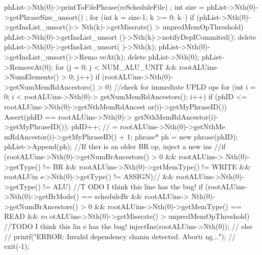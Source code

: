 \begin{DoxyCode}
{{{{{{                                phList->Nth(0)->printToFilePhrase(reScheduleFile)
      ;
                                int size = phList->Nth(0)->getPhraseSize_unsort()
      ;
                                for (int k = size-1; k >= 0; k--) {
                                        if (phList->Nth(0)->getInsList_unsort()->
      Nth(k)->getMissrate() > unpredMemOpThreshold) 
                                                phList->Nth(0)->getInsList_unsort
      ()->Nth(k)->notifyDepICommited();
                                        delete phList->Nth(0)->getInsList_unsort(
      )->Nth(k);
                                        phList->Nth(0)->getInsList_unsort()->Remo
      veAt(k);
                                }
                                delete phList->Nth(0);
                                phList->RemoveAt(0);
                        }
                }
        }
        for (j = 0; j < NUM_ALU_UNIT && rootALUins->NumElements() > 0; j++) {
                if (rootALUins->Nth(0)->getNumMemRdAncestors() > 0) {//check for 
      immediate UPLD ops
                        for (int i = 0; i < rootALUins->Nth(0)->
      getNumMemRdAncestors(); i++) {
                                if (phID <= rootALUins->Nth(0)->getNthMemRdAncest
      or(i)->getMyPhraseID()) {
                                        Assert(phID == rootALUins->Nth(0)->
      getNthMemRdAncestor(i)->getMyPhraseID());
                                        phID++; // = rootALUins->Nth(0)->getNthMe
      mRdAncestor(i)->getMyPhraseID() + 1;
                                        phrase* ph = new phrase(phID);
                                        phList->Append(ph);
                                }
                        }
                }
                //If ther is an older BR op, inject a new ins
                //if (rootALUins->Nth(0)->getNumBrAncestors() > 0 && rootALUins->
      Nth(0)->getType() != BR && rootALUins->Nth(0)->getMemType() != WRITE && rootALUin
      s->Nth(0)->getType() != ASSIGN){// && rootALUins->Nth(0)->getType() != ALU) { //T
      ODO I think this line has the bug!
                if (rootALUins->Nth(0)->getBrMode() == scheduleBr && rootALUins->
      Nth(0)->getNumBrAncestors() > 0 && rootALUins->Nth(0)->getMemType() == READ && ro
      otALUins->Nth(0)->getMissrate() > unpredMemOpThreshold) { //TODO I think this lin
      e has the bug!
                        injectIns(rootALUins->Nth(0));
                //} else {
                //      printf("ERROR: Invalid dependency chanin detected. Aborti
      ng...\n");
                //      exit(-1);
}}}}}}}
\end{DoxyCode}
